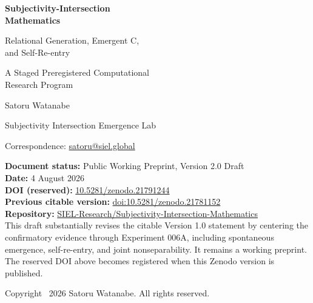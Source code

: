 \documentclass[11pt,a4paper]{article}
\begin{document}
\begin{titlepage}
\thispagestyle{empty}
\vspace*{18mm}
{\sffamily\bfseries\color{SIELblue}\fontsize{24}{29}\selectfont
\mbox{Subjectivity-Intersection}\\Mathematics\par}
\vspace{6mm}
{\sffamily\fontsize{18}{23}\selectfont
Relational Generation, Emergent C,\\and Self-Re-entry\par}
\vspace{7mm}
{\sffamily\fontsize{15}{19}\selectfont
A Staged Preregistered Computational\\Research Program\par}

\vspace{18mm}
{\large Satoru Watanabe\par}
\vspace{2mm}
{\normalsize Subjectivity Intersection Emergence Lab\par}
{\normalsize Correspondence: \href{mailto:satoru@siel.global}{satoru@siel.global}\par}

\vfill
\noindent\colorbox{SIELlight}{%
  \parbox{0.93\textwidth}{%
  \vspace{2mm}
  \textbf{Document status:} Public Working Preprint, Version 2.0 Draft\\
  \textbf{Date:} 4 August 2026\\
  \textbf{DOI (reserved):} \href{https://doi.org/10.5281/zenodo.21791244}{10.5281/zenodo.21791244}\\
  \textbf{Previous citable version:} \href{https://doi.org/10.5281/zenodo.21781152}{doi:10.5281/zenodo.21781152}\\
  \textbf{Repository:} \href{https://github.com/SIEL-Research/Subjectivity-Intersection-Mathematics}{SIEL-Research/Subjectivity-Intersection-Mathematics}\\
  This draft substantially revises the citable Version 1.0 statement by centering the confirmatory evidence through Experiment 006A, including spontaneous emergence, self-re-entry, and joint nonseparability. It remains a working preprint. The reserved DOI above becomes registered when this Zenodo version is published.
  \vspace{2mm}
  }}

\vspace{10mm}
{\small Copyright \textcopyright\ 2026 Satoru Watanabe. All rights reserved.\par}
\end{titlepage}
\end{document}
